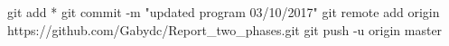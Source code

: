 git add *
git commit -m "updated program 03/10/2017"
git remote add origin https://github.com/Gabydc/Report_two_phases.git
git push -u origin master

